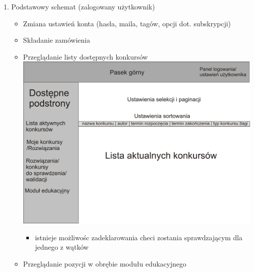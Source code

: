 \documentclass{article}
\begin{document}
\begin{enumerate}
\begin{enumerate}
\begin{itemize}
      \end{itemize}
     \item Podstawowy schemat (zalogowany użytkownik)
     \begin{itemize}
      \item Zmiana ustawień konta (hasła, maila, tagów, opcji dot. subskrypcji)
      \item Składanie zamówienia
      \item Przeglądanie listy dostępnych konkursów\\
	    \includegraphics[scale=0.5]{IO_rysunki.jpg}
      \begin{itemize}
       \item istnieje możliwośc zadeklarowania checi zostania sprawdzającym dla jednego z wątków
      \end{itemize}
      \item Przeglądanie pozycji w obrębie modułu edukacyjnego


\end{itemize}
\end{enumerate}
\end{enumerate}
\end{document}
